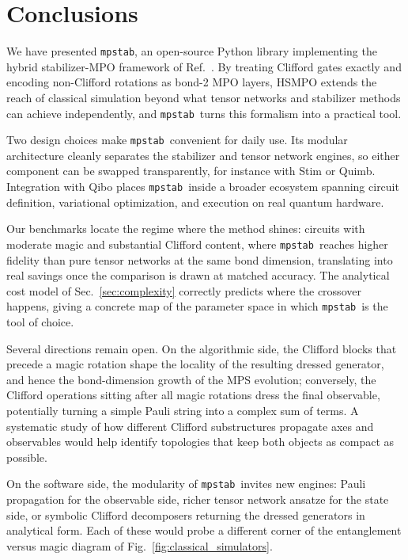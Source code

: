 \documentclass[pra,aps,twocolumn,longbibliography,preprintnumbers,superscriptaddress,nofootnotebib,10pt]{revtex4-2}
\newcommand{\mpstab}{\texttt{mpstab}}
\begin{document}

\section{Conclusions}

We have presented \mpstab, an open-source Python library implementing the 
hybrid stabilizer-MPO framework of Ref.~\cite{Mello_2024}. By treating 
Clifford gates exactly and encoding non-Clifford rotations as bond-2 MPO 
layers, HSMPO extends the reach of classical simulation beyond what 
tensor networks and stabilizer methods can achieve independently, and 
\mpstab\ turns this formalism into a practical tool.

Two design choices make \mpstab\ convenient for daily use. Its modular 
architecture cleanly separates the stabilizer and tensor network engines, 
so either component can be swapped transparently, for instance with Stim 
or Quimb. Integration with Qibo places \mpstab\ inside a broader ecosystem 
spanning circuit definition, variational optimization, and execution on 
real quantum hardware.

Our benchmarks locate the regime where the method shines: circuits with 
moderate magic and substantial Clifford content, where \mpstab\ reaches 
higher fidelity than pure tensor networks at the same bond dimension, 
translating into real savings once the comparison is drawn at matched 
accuracy. The analytical cost model of Sec.~\ref{sec:complexity} correctly 
predicts where the crossover happens, giving a concrete map of the 
parameter space in which \mpstab\ is the tool of choice.

Several directions remain open. On the algorithmic side, the Clifford 
blocks that precede a magic rotation shape the locality of the resulting 
dressed generator, and hence the bond-dimension growth of the MPS 
evolution; conversely, the Clifford operations sitting after all magic 
rotations dress the final observable, potentially turning a simple Pauli 
string into a complex sum of terms. A systematic study of how different 
Clifford substructures propagate axes and observables would help identify 
topologies that keep both objects as compact as possible.

On the software side, the modularity of \mpstab\ invites new engines: 
Pauli propagation for the observable side, richer tensor network ansatze 
for the state side, or symbolic Clifford decomposers returning the 
dressed generators in analytical form. Each of these would probe a 
different corner of the entanglement versus magic diagram of 
Fig.~\ref{fig:classical_simulators}.
\end{document}
